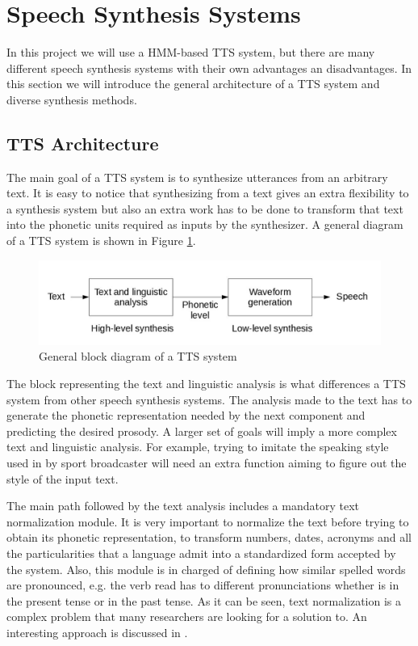 \section{Speech Synthesis Systems}
\label{speec_synthesis_systems}
In this project we will use a HMM-based TTS system, but there are many different speech synthesis systems with their own advantages an disadvantages. In this section we will introduce the general architecture of a TTS system and diverse synthesis methods.

\subsection{TTS Architecture}
\label{speech_synthesis_systems_tts}
The main goal of a TTS system is to synthesize utterances from an arbitrary text. It is easy to notice that synthesizing from a text gives an extra flexibility to a synthesis system but also an extra work has to be done to transform that text into the phonetic units required as inputs by the synthesizer. A general diagram of a TTS system is shown in Figure \ref{fig:tts_architecture}.

\begin{figure}[htb]
	\begin{center}
	\includegraphics[width=\textwidth]{images/tts_architecture.jpg}
	\caption{General block diagram of a TTS system \cite{TuomoMSc}}
	\label{fig:tts_architecture}
	\end{center}
\end{figure}

The block representing the text and linguistic analysis is what differences a TTS system from other speech synthesis systems. The analysis made to the text has to generate the phonetic representation needed by the next component and predicting the desired prosody. A larger set of goals will imply a more complex text and linguistic analysis. For example, trying to imitate the speaking style used in by sport broadcaster will need an extra function aiming to figure out the style of the input text. 

The main path followed by the text analysis includes a mandatory text normalization module. It is very important to normalize the text before trying to obtain its phonetic representation, to transform numbers, dates, acronyms and all the particularities that a language admit into a standardized form accepted by the system. Also, this module is in charged of defining how similar spelled words are pronounced, e.g. the verb read has to different pronunciations whether is in the present tense or in the past tense. As it can be seen, text normalization is a complex problem that many researchers are looking for a solution to. An interesting approach is discussed in \cite{Sproat2001}.

